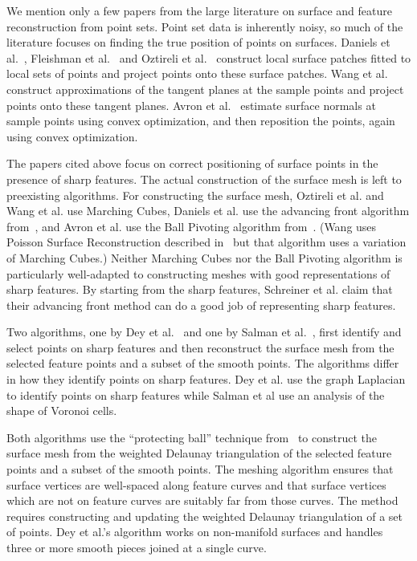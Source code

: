 We mention only a few papers from the large literature
on surface and feature reconstruction from point sets.
Point set data is inherently noisy, so much of the literature
focuses on finding the true position of points on surfaces.
Daniels et al.~\cite{Daniels:2007:Robust},
Fleishman et al.~\cite{fcs-rmlsf-2005}
and Oztireli et al.~\cite{Oztireli2009}
construct local surface patches fitted to local sets of points
and project points onto these surface patches.
Wang et al.~\cite{Wang:2013:Feature}
construct approximations of the tangent planes at the sample points
and project points onto these tangent planes.
Avron et al.~\cite{avron2010L} estimate surface normals
at sample points using convex optimization,
and then reposition the points, again using convex optimization.

The papers cited above focus on correct positioning of surface points
in the presence of sharp features.
The actual construction of the surface mesh is
left to preexisting algorithms.
For constructing the surface mesh,
Oztireli et al. and Wang et al. use Marching Cubes,
Daniels et al. use the advancing front algorithm 
from~\cite{Schreiner:2006:Direct},
and Avron et al. use the Ball Pivoting algorithm 
from~\cite{Bernardini:1999:Ball}.
(Wang uses Poisson Surface Reconstruction described 
in~\cite{Kazhdan:2006:Poisson} but that algorithm
uses a variation of Marching Cubes.)
Neither Marching Cubes nor the Ball Pivoting algorithm
is particularly well-adapted to constructing meshes 
with good representations of sharp features.
By starting from the sharp features,
Schreiner et al. claim that their advancing front method
can do a good job of representing sharp features.

Two algorithms, one by Dey et al.~\cite{dgqsww-fprss-12} and 
one by Salman et al.~\cite{sym-fpmg-10},
first identify and select points on sharp features
and then reconstruct the surface mesh from the selected feature points
and a subset of the smooth points.
The algorithms differ in how they identify points on sharp features.
Dey et al. use the graph Laplacian to identify points on sharp features
while Salman et al use an analysis of the shape of Voronoi cells.

Both algorithms use the ``protecting ball'' technique from~\cite{cdr-drpsc-07}
to construct the surface mesh from the weighted Delaunay triangulation
of the selected feature points and a subset of the smooth points.
The meshing algorithm ensures that surface vertices are well-spaced
along feature curves and that surface vertices which are not 
on feature curves are suitably far from those curves.
The method requires constructing and 
updating the weighted Delaunay triangulation of a set of points.
Dey et al.'s algorithm works on non-manifold surfaces
and handles three or more smooth pieces joined at a single curve.

